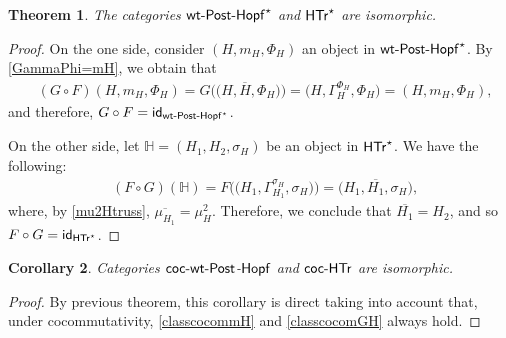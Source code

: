 \documentclass[10pt,a4paper]{amsart}
\numberwithin{equation}{section}
\newtheorem{Theorem}{Theorem}[section]
\newtheorem{Corollary}[Theorem]{Corollary}
\begin{document}
\begin{Theorem}\label{th-iso-wtph-htr}
The categories ${\sf wt}\textnormal{-}{\sf Post}\textnormal{-}{\sf Hopf}^{\star}$ and $\sf{HTr}^{\star}$ are isomorphic.
\end{Theorem}

\begin{proof}
On the one side, consider $(H,m_{H},\Phi_{H})$ an object in ${\sf wt}\textnormal{-}{\sf Post}\textnormal{-}{\sf Hopf}^{\star}$. By \eqref{GammaPhi=mH}, we obtain that
\begin{align*}
&(G\circ F)(H,m_{H},\Phi_{H})=G\bigl(\bigl(H,\overline{H},\Phi_{H}\bigr)\bigr)=\bigl(H,\Gamma_{H}^{\Phi_{H}},\Phi_{H}\bigr)=(H,m_{H},\Phi_{H}),
\end{align*}
and therefore, $G\circ F={\sf id}_{{\sf wt}\textnormal{-}{\sf Post}\textnormal{-}{\sf Hopf}^{\star}}$.

On the other side, let $\mathbb{H}=(H_{1},H_{2},\sigma_{H})$ be an object in $\sf{HTr}^{\star}$. We have the following:
\begin{align*}
&(F\circ G)(\mathbb{H})=F\bigl(\bigl(H_{1},\Gamma_{H_{1}}^{\sigma_{H}},\sigma_{H}\bigr)\bigr)=\bigl(H_{1},\overline{H_{1}},\sigma_{H}\bigr),
\end{align*}
where, by \eqref{mu2Htruss}, $\overline{\mu_{H_{1}}}=\mu_{H}^{2}$. Therefore, we conclude that $\overline{H_{1}}=H_{2}$, and so $F\circ G={\sf id}_{\sf{HTr}^{\star}}$.
\end{proof}


\begin{Corollary}\label{cor-iso-cocwtph-cochtr}
Categories $\sf{coc}\textnormal{-}{\sf wt}\textnormal{-}{\sf Post}$-$\sf{Hopf}$ and $\sf{coc}\textnormal{-}{\sf HTr}$ are isomorphic.
\end{Corollary}
\begin{proof}
By previous theorem, this corollary is direct taking into account that, under cocommutativity, \eqref{classcocommH} and \eqref{classcocomGH} always hold.
\end{proof}
\end{document}
